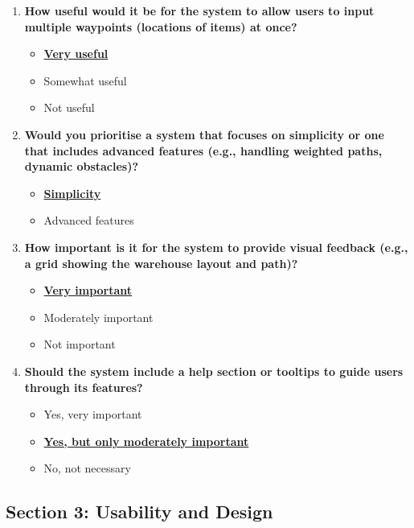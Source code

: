 \begin{enumerate}
    \item \textbf{How useful would it be for the system to allow users to input multiple waypoints (locations of items) at once?}
    \begin{itemize}
        \item \textbf{\underline{Very useful}}
        \item Somewhat useful
        \item Not useful
    \end{itemize}

    \item \textbf{Would you prioritise a system that focuses on simplicity or one that includes advanced features (e.g., handling weighted paths, dynamic obstacles)?}
    \begin{itemize}
        \item \textbf{\underline{Simplicity}}
        \item Advanced features
    \end{itemize}

    \item \textbf{How important is it for the system to provide visual feedback (e.g., a grid showing the warehouse layout and path)?}
    \begin{itemize}
        \item \textbf{\underline{Very important}}
        \item Moderately important
        \item Not important
    \end{itemize}

    \item \textbf{Should the system include a help section or tooltips to guide users through its features?}
    \begin{itemize}
        \item Yes, very important
        \item \textbf{\underline{Yes, but only moderately important}}
        \item No, not necessary
    \end{itemize}
\end{enumerate}

\subsection*{Section 3: Usability and Design}

